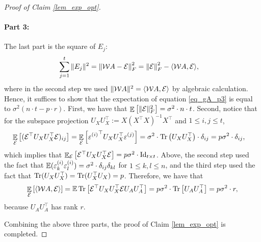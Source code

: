 \begin{proof}[Proof of Claim \ref{lem_exp_opt}]
	\paragraph{Part 3:} The last part is the square of $E_j$:
	\begin{align}\label{eq_gA_p3}
		\sum_{j=1}^t \|E_j\|^2 &= \left\| {\mathcal W} A - \mathcal{E} \right\|_{F}^2
		= \left\| \mathcal{E} \right\|_{F}^2 - \langle {\mathcal W} A, \mathcal{E} \rangle,
	\end{align}
	where in the second step we used $\|{\mathcal W} A\|^2 = \langle {\mathcal W} A, \mathcal{E} \rangle$ by algebraic calculation.
	Hence, it suffices to show that the expectation of equation \eqref{eq_gA_p3} is equal to $\sigma^2 (n\cdot t - p\cdot r)$.
	First, we have that $\mathop{\mathbb{E}}\left[ \|\mathcal{E}\|_F^2 \right] = \sigma^2 \cdot n \cdot t$.
	Second, notice that for the subspace projection $U_XU_X^\top:=X(X^{\top} X)^{-1} X^{\top}$ and $1\le i, j \le t$,
	\begin{align*}
			 \mathop{\mathbb{E}}_{\mathcal{E}}\left[ (\mathcal{E}^{\top}U_XU_X^\top \mathcal{E})_{ij}  \right]
		&= \mathop{\mathbb{E}}_{\mathcal{E}}\left[ {\varepsilon^{(i)}}^\top U_X U_X^\top  \varepsilon^{(j)}  \right] = \sigma^2 \cdot \operatorname{Tr}\left( U_XU_X^\top \right) \cdot \delta_{ij} = p\sigma^2 \cdot \delta_{ij},
	\end{align*}
	which implies that $\mathop{\mathbb{E}}_{\mathcal{E}}\left[ \mathcal{E}^{\top}U_XU_X^\top \mathcal{E}  \right]=p\sigma^2 \cdot \operatorname{Id}_{t\times t}$.
	Above, the second step used the fact that $\mathbb{E}(\varepsilon^{(i)}_k \varepsilon^{(i)}_l )=\sigma^2\cdot \delta_{ij}\delta_{kl}$ for $1\le k,l \le n$, and the third step used the fact that $\operatorname{Tr}(U_XU_X^\top) =\operatorname{Tr}(U_X^\top U_X) =p$.
	Therefore, we have that
	\begin{align*}
		\mathop{\mathbb{E}}_{\mathcal{E}}\left[  \langle {\mathcal W} A, \mathcal{E} \rangle \right] =\mathbb{E} \operatorname{Tr}\left[\mathcal E^\top U_X U_X^\top \mathcal E U_AU_A^\top\right]= p\sigma^2 \cdot \operatorname{Tr}\left[ U_AU_A^\top\right] =  p \sigma^2 \cdot r ,
			\end{align*}
   because $U_AU_A^\top$ has rank $r$.	
	
	Combining the above three parts, the proof of Claim \ref{lem_exp_opt} is completed.
	\end{proof}
	
